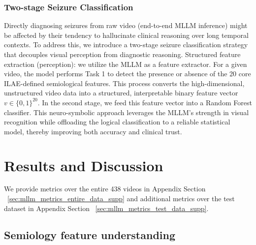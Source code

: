 \documentclass{article}
\theoremstyle{plain}
\theoremstyle{definition}
\theoremstyle{remark}
\begin{document}
\subsubsection{Two-stage Seizure Classification }
\label{subsec:two-stage}

Directly diagnosing seizures from raw video (end-to-end MLLM inference) might be affected by their tendency to hallucinate clinical reasoning over long temporal contexts. To address this, we introduce a two-stage seizure classification strategy that decouples visual perception from diagnostic reasoning.  Structured feature extraction (perception): we utilize the MLLM as a feature extractor. For a given video, the model performs Task 1 to detect the presence or absence of the 20 core ILAE-defined semiological features. This process converts the high-dimensional, unstructured video data into a structured, interpretable binary feature vector $v \in \{0,1\}^{20}$. In the second stage, we feed this feature vector into a Random Forest classifier. This neuro-symbolic approach leverages the MLLM's strength in visual recognition while offloading the logical classification to a reliable statistical model, thereby improving both accuracy and clinical trust.

\section{Results and Discussion}
\label{sec:res_analysis}
We provide metrics over the entire 438 videos in Appendix Section ~\ref{sec:mllm_metrics_entire_data_supp} and additional metrics over the test dataset in Appendix Section ~\ref{sec:mllm_metrics_test_data_supp}.

\subsection{Semiology feature understanding }
\end{document}
